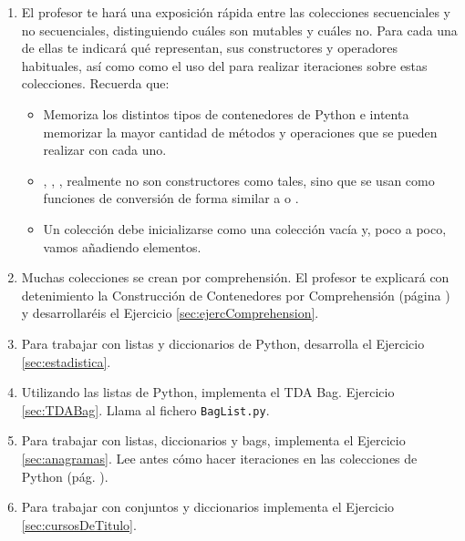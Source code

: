\begin{enumerate}%

\item El profesor te hará una exposición rápida entre las colecciones secuenciales y no secuenciales, distinguiendo cuáles son mutables y cuáles no. Para cada una de ellas te indicará qué representan, sus constructores y operadores habituales, así como como el uso del  para realizar iteraciones sobre estas colecciones.
Recuerda que:

\begin{itemize}
\item Memoriza los distintos tipos de contenedores de Python e intenta memorizar la mayor cantidad de métodos y operaciones que se pueden realizar con cada uno.

\item {}, , ,  realmente no son constructores como tales, sino que se usan como funciones de conversión de forma similar a  o . 

\item Un colección debe inicializarse como una colección vacía y, poco a poco, vamos añadiendo elementos.
\end{itemize}

\item Muchas colecciones se crean por comprehensión. El profesor te explicará con detenimiento la Construcción de Contenedores por Comprehensión (página \pageref{sec:Comprehension}) y desarrollaréis el Ejercicio \ref{sec:ejercComprehension}.

\item Para trabajar con listas y diccionarios de Python, desarrolla el Ejercicio \ref{sec:estadistica}.


\item Utilizando las listas de Python, implementa el TDA Bag. Ejercicio \ref{sec:TDABag}. Llama al fichero \texttt{BagList.py}.

\item Para trabajar con listas, diccionarios y bags, implementa el Ejercicio \ref{sec:anagramas}. Lee antes cómo hacer iteraciones en las colecciones de Python (pág. \pageref{sec:iteracionColecciones}).

\item Para trabajar con conjuntos y diccionarios implementa el Ejercicio \ref{sec:cursosDeTitulo}.
\end{enumerate}


